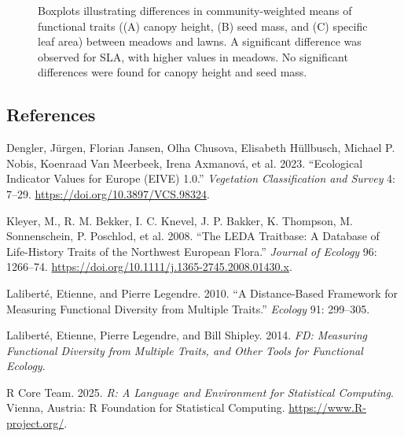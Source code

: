 \documentclass[
  12pt,
  a4paper,
  DIV=11,
  numbers=noendperiod]{scrartcl}
\newlength{\cslhangindent}
\newenvironment{CSLReferences}[2] %
 {\begin{list}{}{%
  \setlength{\itemindent}{0pt}
  \setlength{\leftmargin}{0pt}
  \setlength{\parsep}{0pt}
  \ifodd #1
   \setlength{\leftmargin}{\cslhangindent}
   \setlength{\itemindent}{-1\cslhangindent}
  \fi
  \setlength{\itemsep}{#2\baselineskip}}}
 {\end{list}}
\begin{document}
\begin{figure}[H]


\caption{\label{fig-traits_cwm}Boxplots illustrating differences in
community-weighted means of functional traits ((A) canopy height, (B)
seed mass, and (C) specific leaf area) between meadows and lawns. A
significant difference was observed for SLA, with higher values in
meadows. No significant differences were found for canopy height and
seed mass.}

\end{figure}%

\subsection{References}\label{references}

\label{refs}
\begin{CSLReferences}{1}{0}
Dengler, Jürgen, Florian Jansen, Olha Chusova, Elisabeth Hüllbusch,
Michael P. Nobis, Koenraad Van Meerbeek, Irena Axmanová, et al. 2023.
{``Ecological Indicator Values for Europe (EIVE) 1.0.''}
\emph{Vegetation Classification and Survey} 4: 7--29.
\url{https://doi.org/10.3897/VCS.98324}.

Kleyer, M., R. M. Bekker, I. C. Knevel, J. P. Bakker, K. Thompson, M.
Sonnenschein, P. Poschlod, et al. 2008. {``The LEDA Traitbase: A
Database of Life-History Traits of the Northwest European Flora.''}
\emph{Journal of Ecology} 96: 1266--74.
\url{https://doi.org/10.1111/j.1365-2745.2008.01430.x}.

Laliberté, Etienne, and Pierre Legendre. 2010. {``A Distance-Based
Framework for Measuring Functional Diversity from Multiple Traits.''}
\emph{Ecology} 91: 299--305.

Laliberté, Etienne, Pierre Legendre, and Bill Shipley. 2014. \emph{FD:
Measuring Functional Diversity from Multiple Traits, and Other Tools for
Functional Ecology}.

R Core Team. 2025. \emph{R: A Language and Environment for Statistical
Computing}. Vienna, Austria: R Foundation for Statistical Computing.
\url{https://www.R-project.org/}.

\end{CSLReferences}
\end{document}
